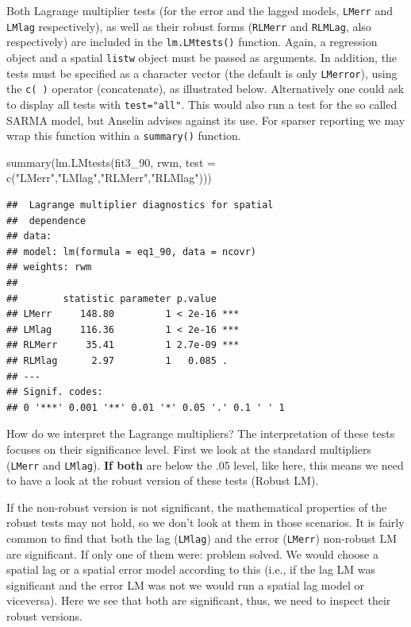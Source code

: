\documentclass[
  krantz2]{krantz}
\makeatletter
\newenvironment{Shaded}{\begin{snugshade}}{\end{snugshade}}
\newcommand{\AttributeTok}[1]{\textcolor[rgb]{0.61,0.61,0.61}{#1}}
\newcommand{\FunctionTok}[1]{\textcolor[rgb]{0,0,0}{#1}}
\newcommand{\NormalTok}[1]{#1}
\newcommand{\StringTok}[1]{\textcolor[rgb]{0.5,0.5,0.5}{#1}}
\newenvironment{kframe}{%
\medskip{}
\setlength{\fboxsep}{.8em}
 \def\at@end@of@kframe{}%
 \ifinner\ifhmode%
  \def\at@end@of@kframe{\end{minipage}}%
  \begin{minipage}{\columnwidth}%
 \fi\fi%
 \def\FrameCommand##1{\hskip\@totalleftmargin \hskip-\fboxsep
 \colorbox{shadecolor}{##1}\hskip-\fboxsep
     \hskip-\linewidth \hskip-\@totalleftmargin \hskip\columnwidth}%
 \MakeFramed {\advance\hsize-\width
   \@totalleftmargin\z@ \linewidth\hsize
   \@setminipage}}%
 {\par\unskip\endMakeFramed%
 \at@end@of@kframe}
\renewenvironment{Shaded}{\begin{kframe}}{\end{kframe}}
\makeatother
\begin{document}
Both Lagrange multiplier tests (for the error and the lagged models, \texttt{LMerr} and \texttt{LMlag} respectively), as well as their robust forms (\texttt{RLMerr} and \texttt{RLMLag}, also respectively) are included in the \texttt{lm.LMtests()} function. Again, a regression object and a spatial \texttt{listw} object must be passed as arguments. In addition, the tests must be specified as a character vector (the default is only \texttt{LMerror}), using the \texttt{c(\ )} operator (concatenate), as illustrated below. Alternatively one could ask to display all tests with \texttt{test="all"}. This would also run a test for the so called SARMA model, but Anselin advises against its use. For sparser reporting we may wrap this function within a \texttt{summary()} function.

\begin{Shaded}
\begin{Highlighting}[]
\FunctionTok{summary}\NormalTok{(}\FunctionTok{lm.LMtests}\NormalTok{(fit3\_90, rwm, }\AttributeTok{test =} \FunctionTok{c}\NormalTok{(}\StringTok{"LMerr"}\NormalTok{,}\StringTok{"LMlag"}\NormalTok{,}\StringTok{"RLMerr"}\NormalTok{,}\StringTok{"RLMlag"}\NormalTok{)))}
\end{Highlighting}
\end{Shaded}

\begin{verbatim}
##  Lagrange multiplier diagnostics for spatial
##  dependence
## data:  
## model: lm(formula = eq1_90, data = ncovr)
## weights: rwm
##  
##        statistic parameter p.value    
## LMerr     148.80         1 < 2e-16 ***
## LMlag     116.36         1 < 2e-16 ***
## RLMerr     35.41         1 2.7e-09 ***
## RLMlag      2.97         1   0.085 .  
## ---
## Signif. codes:  
## 0 '***' 0.001 '**' 0.01 '*' 0.05 '.' 0.1 ' ' 1
\end{verbatim}

How do we interpret the Lagrange multipliers? The interpretation of these tests focuses on their significance level. First we look at the standard multipliers (\texttt{LMerr} and \texttt{LMlag}). \textbf{If both} are below the .05 level, like here, this means we need to have a look at the robust version of these tests (Robust LM).

If the non-robust version is not significant, the mathematical properties of the robust tests may not hold, so we don't look at them in those scenarios. It is fairly common to find that both the lag (\texttt{LMlag}) and the error (\texttt{LMerr}) non-robust LM are significant. If only one of them were: problem solved. We would choose a spatial lag or a spatial error model according to this (i.e., if the lag LM was significant and the error LM was not we would run a spatial lag model or viceversa). Here we see that both are significant, thus, we need to inspect their robust versions.
\end{document}

